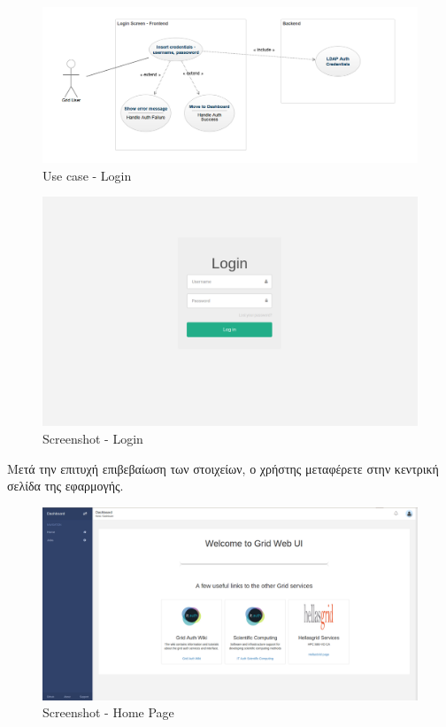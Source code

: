 \begin{figure}[t]
\caption{Use case - Login}
\includegraphics[width=16cm]{../images/login-use-case.png}
\centering
\end{figure}
\clearpage

\begin{figure}[t]
\caption{Screenshot - Login}
\includegraphics[width=16cm]{../images/login-screenshot.png}
\centering
\end{figure}
\clearpage

Μετά την επιτυχή επιβεβαίωση των στοιχείων, ο χρήστης μεταφέρετε στην κεντρική σελίδα της εφαρμογής.



\begin{figure}[t]
\caption{Screenshot - Home Page}
\includegraphics[width=16cm]{../images/home-page-screenshot.png}
\centering
\end{figure}
\clearpage

